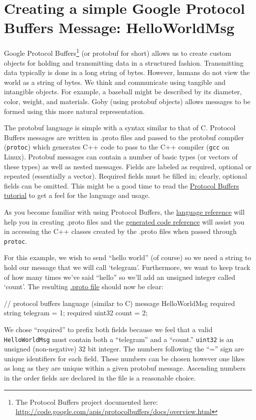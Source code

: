 \documentclass[11pt, letterpaper, oneside]{memoir}
\begin{document}
\section{Creating a simple Google Protocol Buffers Message: HelloWorldMsg}\label{sec:proto_ex}

Google Protocol Buffers\footnote{The Protocol Buffers project documented here: \url{http://code.google.com/apis/protocolbuffers/docs/overview.html}} (or protobuf for short) allows us to create custom objects for holding and transmitting data in a structured fashion. Transmitting data typically is done in a long string of bytes. However, humans do not view the world as a string of bytes. We think and communicate using tangible and intangible objects. For example, a baseball might be described by its diameter, color, weight, and materials. Goby (using protobuf objects) allows messages to be formed using this more natural representation.

The protobuf language is simple with a syntax similar to that of C. Protocol Buffers messages are written in .proto files and passed to the protobuf compiler (\verb|protoc|) which generates C++ code to pass to the C++ compiler (\verb|gcc| on Linux). Protobuf messages can contain a number of basic types (or vectors of these types) as well as nested messages. Fields are labeled as required, optional or repeated (essentially a vector). Required fields must be filled in; clearly, optional fields can be omitted. This might be a good time to read the \href{http://code.google.com/apis/protocolbuffers/docs/cpptutorial.html}{Protocol Buffers tutorial} to get a feel for the language and usage.

As you become familiar with using Protocol Buffers, the \href{http://code.google.com/apis/protocolbuffers/docs/proto.html}{language reference} will help you in creating .proto files and the \href{http://code.google.com/apis/protocolbuffers/docs/reference/cpp-generated.html}{generated code reference} will assist you in accessing the C++ classes created by the .proto files when passed through \verb|protoc|.

For this example, we wish to send ``hello world'' (of course) so we need a string to hold our message that we will call `telegram'. Furthermore, we want to keep track of how many times we've said ``hello'' so we'll add an unsigned integer called `count'. The resulting \href{http://bazaar.launchpad.net/~goby-dev/goby/trunk/annotate/head:/src/core/examples/ex1_hello_world/hello_world.proto}{.proto file} should now be clear:
\begin{boxedverbatim}
// protocol buffers language (similar to C)
message HelloWorldMsg
{
  required string telegram = 1;
  required uint32 count = 2;
}
\end{boxedverbatim}
\resetbvlinenumber
We chose ``required'' to prefix both fields because we feel that a valid \verb|HelloWorldMsg| must contain both a ``telegram'' and a ``count.'' \verb|uint32| is an unsigned (non-negative) 32 bit integer. The numbers following the ``='' sign are unique identifiers for each field. These numbers can be chosen however one likes as long as they are unique within a given protobuf message. Ascending numbers in the order fields are declared in the file is a reasonable choice.
\end{document}
